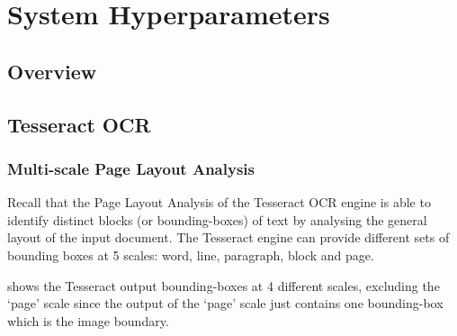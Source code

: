 
\chapter{System Hyperparameters}

\ifpdf
    \graphicspath{{Chapter4/Figs/Raster/}{Chapter4/Figs/PDF/}{Chapter4/Figs/}}
\else
    \graphicspath{{Chapter4/Figs/Vector/}{Chapter4/Figs/}}
\fi


\section{Overview}


\section{Tesseract OCR}

\subsection{Multi-scale Page Layout Analysis}

Recall that the Page Layout Analysis of the Tesseract OCR engine is able to identify distinct blocks (or bounding-boxes) of text by analysing the general layout of the input document. The Tesseract engine can provide different sets of bounding boxes at 5 scales: word, line, paragraph, block and page.

 shows the Tesseract output bounding-boxes at 4 different scales, excluding the `page' scale since the output of the `page' scale just contains one bounding-box which is the image boundary.

